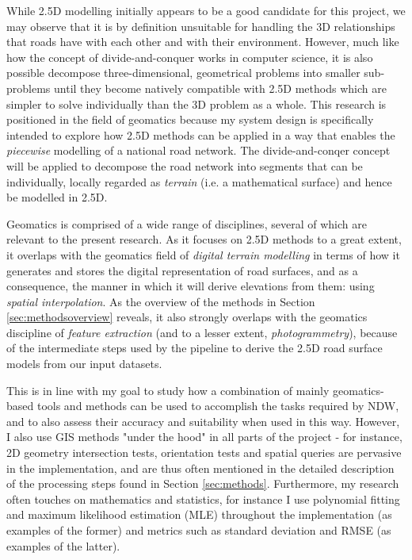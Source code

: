 While 2.5D modelling initially appears to be a good candidate for this project, we may observe that it is by definition unsuitable for handling the 3D relationships that roads have with each other and with their environment. However, much like how the concept of divide-and-conquer works in computer science, it is also possible decompose three-dimensional, geometrical problems into smaller sub-problems until they become natively compatible with 2.5D methods which are simpler to solve individually than the 3D problem as a whole. This research is positioned in the field of geomatics because my system design is specifically intended to explore how 2.5D methods can be applied in a way that enables the \textit{piecewise} modelling of a national road network. The divide-and-conqer concept will be applied to decompose the road network into segments that can be individually, locally regarded as \textit{terrain} (i.e. a mathematical surface) and hence be modelled in 2.5D.

Geomatics is comprised of a wide range of disciplines, several of which are relevant to the present research. As it focuses on 2.5D methods to a great extent, it overlaps with the geomatics field of \textit{digital terrain modelling} in terms of how it generates and stores the digital representation of road surfaces, and as a consequence, the manner in which it will derive elevations from them: using \textit{spatial interpolation}. As the overview of the methods in Section \ref{sec:methodsoverview} reveals, it also strongly overlaps with the geomatics discipline of \textit{feature extraction} (and to a lesser extent, \textit{photogrammetry}), because of the intermediate steps used by the pipeline to derive the 2.5D road surface models from our input datasets.

This is in line with my goal to study how a combination of mainly geomatics-based tools and methods can be used to accomplish the tasks required by NDW, and to also assess their accuracy and suitability when used in this way. However, I also use GIS methods "under the hood" in all parts of the project - for instance, 2D geometry intersection tests, orientation tests and spatial queries are pervasive in the implementation, and are thus often mentioned in the detailed description of the processing steps found in Section \ref{sec:methods}. Furthermore, my research often touches on mathematics and statistics, for instance I use polynomial fitting and maximum likelihood estimation (MLE) throughout the implementation (as examples of the former) and metrics such as standard deviation and RMSE (as examples of the latter).

